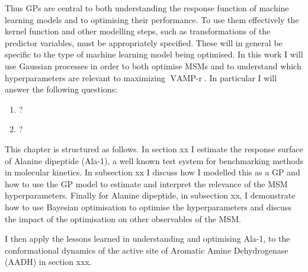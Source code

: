 Thus GPs are central to both understanding the response function of machine learning models and to optimising their performance. To use them effectively the kernel function and other modelling steps, such as transformations of the predictor variables, must be appropriately specified. These will in general be specific to the type of machine learning model being optimised.  In this work  I will use Gaussian processes in order to both optimise MSMs and to understand which hyperparameters are relevant to maximizing $\operatorname{VAMP-r}$.  In particular I will answer the following questions: 

\begin{enumerate}
    \item ?
    \item ?
\end{enumerate}

This chapter is structured as follows. In section xx I estimate the response surface of Alanine dipeptide (Ala-1), a well known test system for benchmarking methods in molecular kinetics. In subsection xx I discuss how I modelled this as a GP and how to use the GP model to estimate and interpret the relevance of the MSM hyperparameters. Finally for Alanine dipeptide, in subsection xx, I demonstrate how to use Bayesian optimisation to optimise the hyperparameters and discuss the impact of the optimisation on other observables of the MSM. 

I then apply the lessons learned in understanding and optimising Ala-1, to the conformational dynamics of the active site of Aromatic Amine Dehydrogenase (AADH) in section xxx. 




